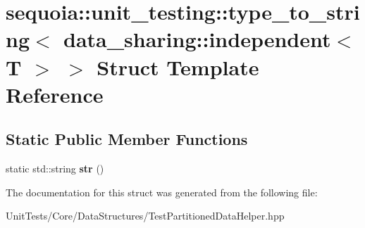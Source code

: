 \hypertarget{structsequoia_1_1unit__testing_1_1type__to__string_3_01data__sharing_1_1independent_3_01_t_01_4_01_4}{}\section{sequoia\+::unit\+\_\+testing\+::type\+\_\+to\+\_\+string$<$ data\+\_\+sharing\+::independent$<$ T $>$ $>$ Struct Template Reference}
\label{structsequoia_1_1unit__testing_1_1type__to__string_3_01data__sharing_1_1independent_3_01_t_01_4_01_4}
\subsection*{Static Public Member Functions}
\begin{DoxyCompactItemize}
\item 
\mbox{\label{structsequoia_1_1unit__testing_1_1type__to__string_3_01data__sharing_1_1independent_3_01_t_01_4_01_4_ac6c9feb71bc83c70251972895872c812}} 
static std\+::string {\bfseries str} ()
\end{DoxyCompactItemize}


The documentation for this struct was generated from the following file\+:\begin{DoxyCompactItemize}
\item 
Unit\+Tests/\+Core/\+Data\+Structures/Test\+Partitioned\+Data\+Helper.\+hpp\end{DoxyCompactItemize}
